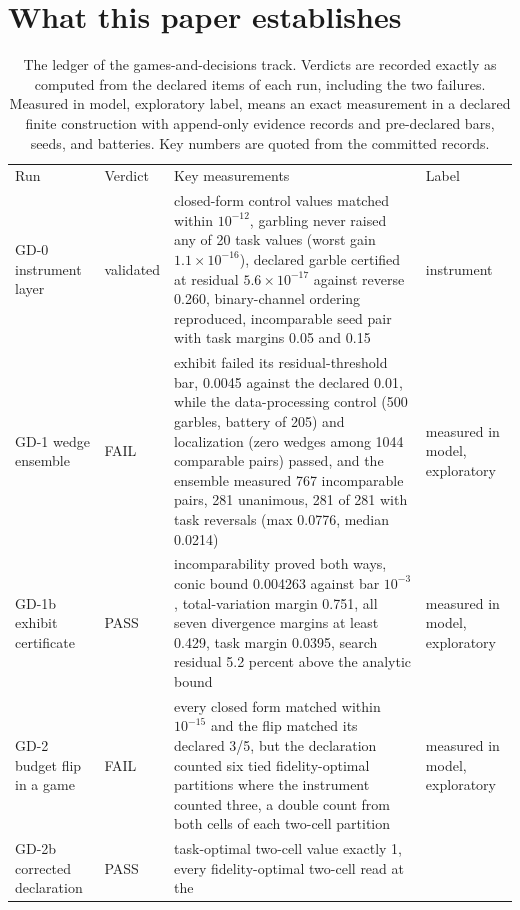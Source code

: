 \documentclass[aps,pre,reprint,nofootinbib]{revtex4-2}
\begin{document}
\section{What this paper establishes}
\label{sec:claims}

\begin{table}[t]
\caption{The ledger of the games-and-decisions track.  Verdicts are
recorded exactly as computed from the declared items of each run,
including the two failures.  Measured in model, exploratory label,
means an exact measurement in a declared finite construction with
append-only evidence records and pre-declared bars, seeds, and
batteries.  Key numbers are quoted from the committed records.}
\label{tab:ledger}
\begin{ruledtabular}
\begin{tabular}{L{2.6cm}lL{9.6cm}L{2.9cm}}
Run & Verdict & Key measurements & Label \\
\colrule
GD-0 instrument layer & validated & closed-form control values
matched within $10^{-12}$, garbling never raised any of 20 task
values (worst gain
$1.1\times10^{-16}$), declared garble certified at residual
$5.6\times10^{-17}$ against reverse 0.260, binary-channel ordering
reproduced, incomparable seed pair with task margins 0.05 and 0.15 &
instrument \\
GD-1 wedge ensemble & FAIL & exhibit failed its residual-threshold
bar, 0.0045 against the declared 0.01, while the data-processing
control (500 garbles, battery of 205) and localization (zero wedges
among 1044 comparable pairs) passed, and the ensemble measured 767
incomparable pairs, 281 unanimous, 281 of 281 with task reversals
(max 0.0776, median 0.0214) & measured in model, exploratory \\
GD-1b exhibit certificate & PASS & incomparability proved both ways,
conic bound 0.004263 against bar $10^{-3}$, total-variation margin
0.751, all seven divergence margins at least 0.429, task margin
0.0395, search residual 5.2 percent above the analytic bound &
measured in model, exploratory \\
GD-2 budget flip in a game & FAIL & every closed form matched within
$10^{-15}$ and the flip matched its declared 3/5, but the declaration
counted six tied fidelity-optimal partitions where the instrument
counted three, a double count from both cells of each two-cell
partition & measured in model, exploratory \\
GD-2b corrected declaration & PASS & task-optimal two-cell value
exactly 1, every fidelity-optimal two-cell read at the

\end{tabular}
\end{ruledtabular}
\end{table}
\end{document}
